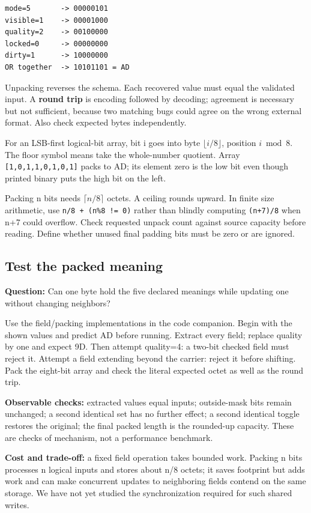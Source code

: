 \begin{verbatim}
mode=5       -> 00000101
visible=1    -> 00001000
quality=2    -> 00100000
locked=0     -> 00000000
dirty=1      -> 10000000
OR together  -> 10101101 = AD
\end{verbatim}

Unpacking reverses the schema. Each recovered value must equal the validated input. A \textbf{round trip} is encoding followed by decoding; agreement is necessary but not sufficient, because two matching bugs could agree on the wrong external format. Also check expected bytes independently.

For an LSB-first logical-bit array, bit i goes into byte \(\lfloor i/8\rfloor\), position \(i\bmod8\). The floor symbol means take the whole-number quotient. Array \texttt{{[}1,0,1,1,0,1,0,1{]}} packs to AD; its element zero is the low bit even though printed binary puts the high bit on the left.

Packing n bits needs \(\lceil n/8\rceil\) octets. A ceiling rounds upward. In finite size arithmetic, use \texttt{n/8\ +\ (n\%8\ !=\ 0)} rather than blindly computing \texttt{(n+7)/8} when n+7 could overflow. Check requested unpack count against source capacity before reading. Define whether unused final padding bits must be zero or are ignored.

\subsection{Test the packed meaning}\label{05-engine-i-ch001-test-the-packed-meaning}

\textbf{Question:} Can one byte hold the five declared meanings while updating one without changing neighbors?

Use the field/packing implementations in the code companion. Begin with the shown values and predict AD before running. Extract every field; replace quality by one and expect 9D. Then attempt quality=4: a two-bit checked field must reject it. Attempt a field extending beyond the carrier: reject it before shifting. Pack the eight-bit array and check the literal expected octet as well as the round trip.

\textbf{Observable checks:} extracted values equal inputs; outside-mask bits remain unchanged; a second identical set has no further effect; a second identical toggle restores the original; the final packed length is the rounded-up capacity. These are checks of mechanism, not a performance benchmark.

\textbf{Cost and trade-off:} a fixed field operation takes bounded work. Packing n bits processes n logical inputs and stores about n/8 octets; it saves footprint but adds work and can make concurrent updates to neighboring fields contend on the same storage. We have not yet studied the synchronization required for such shared writes.

